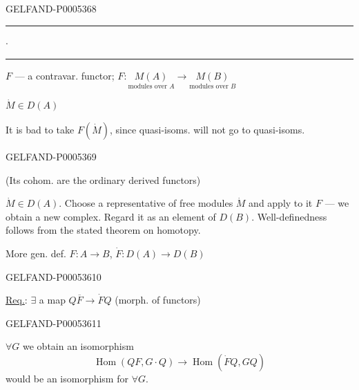 \begin{GelfandAdjacentEvidence}{GELFAND-P000536}{8}


\noindent\makebox[.64\linewidth]{\dotfill}\par
\hfill\rule{1.4cm}{.35pt}\enspace\(\cdot\)\enspace\rule{1.4cm}{.35pt}\par

$F$ — a contravar. functor; \(
F:\underset{\text{modules over }A}{M(A)}
\to\underset{\text{modules over }B}{M(B)}
\)

\(\dot M\in D(A)\)

It is bad to take \(F(\dot M)\), since quasi-isoms. will not go to quasi-isoms.

\end{GelfandAdjacentEvidence}
\begin{GelfandAdjacentEvidence}{GELFAND-P000536}{9}

(Its cohom. are the ordinary derived functors)

\(\dot M\in D(A)\). Choose a representative of free modules \(\dot M\) and apply to it $F$ — we obtain a new complex.
Regard it as an element of \(D(B)\). Well-definedness follows from the stated theorem on homotopy.

More gen. def. \(F:A\to B\), \(\dot F:D(A)\to D(B)\)
\end{GelfandAdjacentEvidence}
\begin{GelfandAdjacentEvidence}{GELFAND-P000536}{10}


\uline{Req.}: \(\exists\) a map \(Q\overline F\to\dot FQ\)
(morph. of functors)
\end{GelfandAdjacentEvidence}
\begin{GelfandAdjacentEvidence}{GELFAND-P000536}{11}


\(\forall G\) we obtain an isomorphism
\[
\operatorname{Hom}(QF,G\cdot Q)\longrightarrow\operatorname{Hom}(\dot FQ,GQ)
\]
would be an isomorphism for \(\forall G\).
\end{GelfandAdjacentEvidence}


